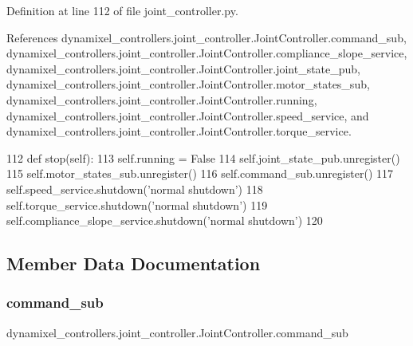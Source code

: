 Definition at line 112 of file joint\+\_\+controller.\+py.



References dynamixel\+\_\+controllers.\+joint\+\_\+controller.\+Joint\+Controller.\+command\+\_\+sub, dynamixel\+\_\+controllers.\+joint\+\_\+controller.\+Joint\+Controller.\+compliance\+\_\+slope\+\_\+service, dynamixel\+\_\+controllers.\+joint\+\_\+controller.\+Joint\+Controller.\+joint\+\_\+state\+\_\+pub, dynamixel\+\_\+controllers.\+joint\+\_\+controller.\+Joint\+Controller.\+motor\+\_\+states\+\_\+sub, dynamixel\+\_\+controllers.\+joint\+\_\+controller.\+Joint\+Controller.\+running, dynamixel\+\_\+controllers.\+joint\+\_\+controller.\+Joint\+Controller.\+speed\+\_\+service, and dynamixel\+\_\+controllers.\+joint\+\_\+controller.\+Joint\+Controller.\+torque\+\_\+service.


\begin{DoxyCode}
112     \textcolor{keyword}{def }stop(self):
113         self.running = \textcolor{keyword}{False}
114         self.joint\_state\_pub.unregister()
115         self.motor\_states\_sub.unregister()
116         self.command\_sub.unregister()
117         self.speed\_service.shutdown(\textcolor{stringliteral}{'normal shutdown'})
118         self.torque\_service.shutdown(\textcolor{stringliteral}{'normal shutdown'})
119         self.compliance\_slope\_service.shutdown(\textcolor{stringliteral}{'normal shutdown'})
120 
\end{DoxyCode}


\subsection{Member Data Documentation}
\mbox{\label{classdynamixel__controllers_1_1joint__controller_1_1_joint_controller_a867bb1c6fc7084a725ff37a2c118d60d}} 
\subsubsection{\texorpdfstring{command\+\_\+sub}{command\_sub}}
{\footnotesize\ttfamily dynamixel\+\_\+controllers.\+joint\+\_\+controller.\+Joint\+Controller.\+command\+\_\+sub\hspace{0.3cm}{\ttfamily [inherited]}}




